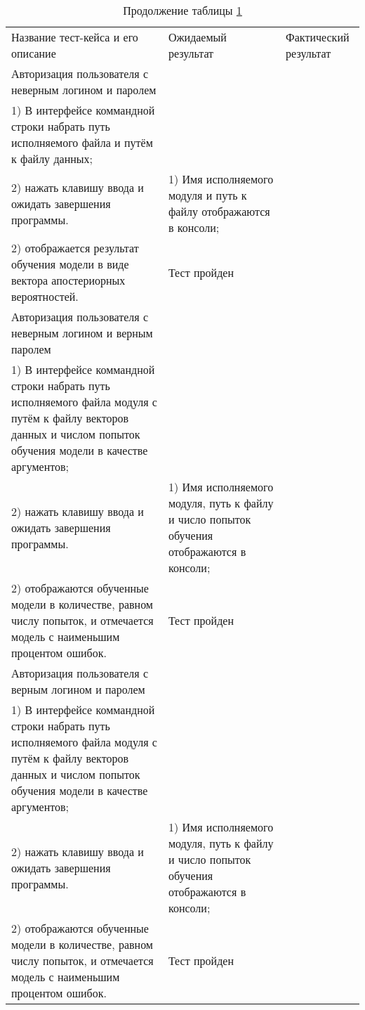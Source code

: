 \begin{longtable}[l]{| >{\raggedright}p{}
                     | >{\raggedright}p{}
                     | >{\raggedright\arraybackslash}p{}|}
  \caption{Тестирование модуля контроля доступа}
  \label{table:testing:bayes}\\
  \endfirsthead
  \caption*{Продолжение таблицы \ref{table:testing:bayes}}\\
  \endhead

  \hline
       Название тест-кейса и его описание & Ожидаемый результат & Фактический результат \\
   \hline
   Авторизация пользователя с неверным логином и паролем \\
   1) В интерфейсе коммандной строки набрать путь исполняемого файла и путём к файлу данных; \\
   2) нажать клавишу ввода и ожидать завершения программы.
   &
   1) Имя исполняемого модуля и путь к файлу отображаются в консоли; \\
   2) отображается результат обучения модели в виде вектора апостериорных вероятностей.
   &
   Тест пройден \\ \hline

   Авторизация пользователя с неверным логином и верным паролем \\ 
   1) В интерфейсе коммандной строки набрать путь исполняемого файла модуля с путём к файлу векторов данных и числом попыток обучения модели в качестве аргументов; \\
   2) нажать клавишу ввода и ожидать завершения программы.
   &
   1) Имя исполняемого модуля, путь к файлу и число попыток обучения отображаются в консоли; \\
   2) отображаются обученные модели в количестве, равном числу попыток, и отмечается модель с наименьшим процентом ошибок.
   &
   Тест пройден \\ \hline

   Авторизация пользователя с верным логином и паролем \\ 
   1) В интерфейсе коммандной строки набрать путь исполняемого файла модуля с путём к файлу векторов данных и числом попыток обучения модели в качестве аргументов; \\
   2) нажать клавишу ввода и ожидать завершения программы.
   &
   1) Имя исполняемого модуля, путь к файлу и число попыток обучения отображаются в консоли; \\
   2) отображаются обученные модели в количестве, равном числу попыток, и отмечается модель с наименьшим процентом ошибок.
   &
   Тест пройден \\ \hline
\end{longtable}

